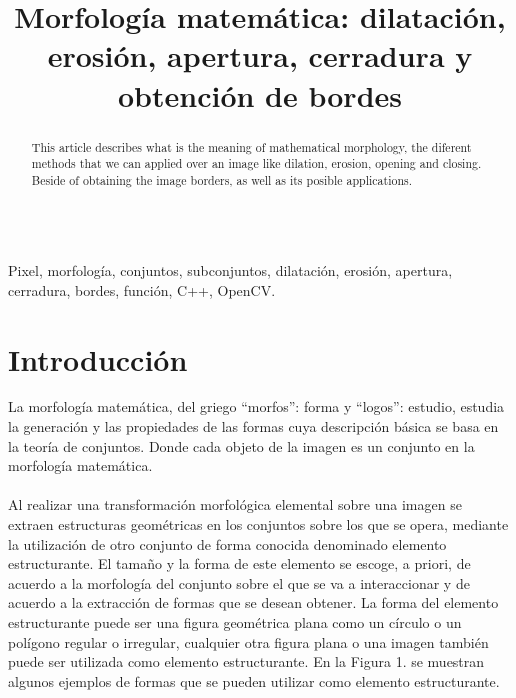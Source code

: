 \documentclass[conference]{IEEEtran}
\begin{document}
\title{ Morfolog\'ia matem\'atica: dilataci\'on, erosi\'on, apertura, cerradura y obtenci\'on de bordes }
\author{
}

\maketitle
\renewcommand\abstractname{Abstract}
\begin{abstract}
This article describes what is the meaning of mathematical morphology, the diferent methods that we can applied over an image like dilation, erosion, opening and closing. Beside of obtaining the image borders, as well as its posible applications. \\\\
\end{abstract}

\begin{IEEEkeywords}
Pixel, morfolog\'ia, conjuntos, subconjuntos, dilataci\'on, erosi\'on, apertura, cerradura, bordes, funci\'on, C++, OpenCV.
\end{IEEEkeywords}

\IEEEpeerreviewmaketitle
\section{Introducci\'on}
La morfolog\'ia matem\'atica, del griego ``morfos'': forma y ``logos'': estudio, estudia la generaci\'on y las propiedades de las formas cuya descripci\'on b\'asica se basa en la teor\'ia de conjuntos. Donde cada objeto de la imagen es un conjunto en la morfolog\'ia matem\'atica.\\\\
Al realizar una transformaci\'on morfol\'ogica elemental sobre una imagen se extraen estructuras geom\'etricas en los conjuntos sobre los que se opera, mediante la utilizaci\'on de otro conjunto de forma conocida denominado elemento estructurante. El tama\~no y la forma de este elemento se escoge, a priori, de acuerdo a la morfolog\'ia del conjunto sobre el que se va a interaccionar y de acuerdo a la extracci\'on de formas que se desean obtener. La forma del elemento estructurante puede ser una figura geom\'etrica plana como un c\'irculo o un pol\'igono regular o irregular, cualquier otra figura plana o una imagen tambi\'en puede ser utilizada como elemento estructurante. En la Figura 1. se muestran algunos ejemplos de formas que se pueden utilizar como elemento estructurante. \\
\end{document}
